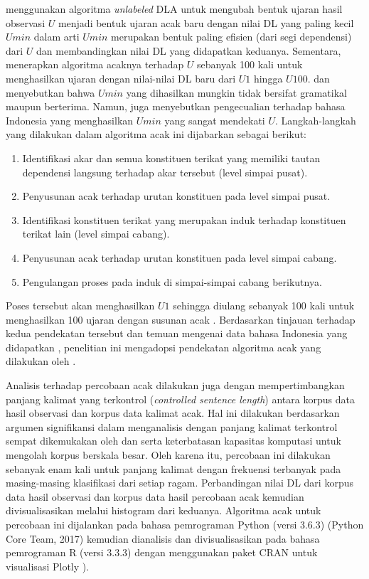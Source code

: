 \cite{gildea2010grammars} menggunakan algoritma \textit{unlabeled} DLA untuk mengubah bentuk ujaran hasil observasi $U$ menjadi bentuk ujaran acak baru dengan nilai DL yang paling kecil $Umin$ dalam arti $Umin$ merupakan bentuk paling efisien (dari segi dependensi) dari $U$ dan membandingkan nilai DL yang didapatkan keduanya. Sementara, \cite{futrell2015large} menerapkan algoritma acaknya terhadap $U$ sebanyak 100 kali untuk menghasilkan ujaran dengan nilai-nilai DL baru dari $U1$ hingga $U100$. \cite{futrell2015large} dan \cite{gildea2010grammars} menyebutkan bahwa $Umin$ yang dihasilkan mungkin tidak bersifat gramatikal maupun berterima. Namun, \cite{futrell2015large} juga menyebutkan pengecualian terhadap bahasa Indonesia yang menghasilkan $Umin$ yang sangat mendekati $U$. Langkah-langkah yang dilakukan dalam algoritma acak ini dijabarkan sebagai berikut:
\begin{enumerate}
\item Identifikasi akar dan semua konstituen terikat yang memiliki tautan dependensi langsung terhadap akar tersebut (level simpai pusat).
\item Penyusunan acak terhadap urutan konstituen pada level simpai pusat.
\item Identifikasi konstituen terikat yang merupakan induk terhadap konstituen terikat lain (level simpai cabang).
\item Penyusunan acak terhadap urutan konstituen pada level simpai cabang.
\item Pengulangan proses pada induk di simpai-simpai cabang berikutnya.
\end{enumerate}
Poses tersebut akan menghasilkan $U1$ sehingga diulang sebanyak 100 kali untuk menghasilkan 100 ujaran dengan susunan acak \citep{futrell2015large}. Berdasarkan tinjauan terhadap kedua pendekatan tersebut dan temuan mengenai data bahasa Indonesia yang didapatkan \cite{futrell2015large}, penelitian ini mengadopsi pendekatan algoritma acak yang dilakukan oleh \cite{futrell2015large}.

Analisis terhadap percobaan acak dilakukan juga dengan mempertimbangkan panjang kalimat yang terkontrol (\textit{controlled sentence length}) antara korpus data hasil observasi dan korpus data kalimat acak. Hal ini dilakukan berdasarkan argumen signifikansi dalam menganalisis dengan panjang kalimat terkontrol sempat dikemukakan oleh \cite{ferrer2014risks} dan \cite{jiang2015effects} serta keterbatasan kapasitas komputasi untuk mengolah korpus berskala besar. Oleh karena itu, percobaan ini dilakukan sebanyak enam kali untuk panjang kalimat dengan frekuensi terbanyak pada masing-masing klasifikasi dari setiap ragam. Perbandingan nilai DL dari korpus data hasil observasi dan korpus data hasil percobaan acak kemudian divisualisasikan melalui histogram dari keduanya. Algoritma acak untuk percobaan ini dijalankan pada bahasa pemrograman Python (versi 3.6.3) (Python Core Team, 2017) kemudian dianalisis dan divisualisasikan pada bahasa pemrograman R (versi 3.3.3) \citep{r2017project} dengan menggunakan paket CRAN untuk visualisasi Plotly \citep{sievert2017plotly}).


